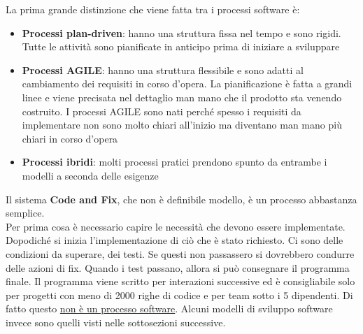 La prima grande distinzione che viene fatta tra i processi software è:
\begin{itemize}[noitemsep]
    \item \textbf{Processi plan-driven}: hanno una struttura fissa nel tempo e sono rigidi. Tutte le attività sono pianificate in anticipo prima di iniziare a sviluppare
    \item \textbf{Processi AGILE}: hanno una struttura flessibile e sono adatti al cambiamento dei requisiti in corso d'opera. La pianificazione è fatta a grandi linee e viene precisata nel dettaglio man mano che il prodotto sta venendo costruito. I processi AGILE sono nati perché spesso i requisiti da implementare non sono molto chiari all'inizio ma diventano man mano più chiari in corso d'opera
    \item \textbf{Processi ibridi}: molti processi pratici prendono spunto da entrambe i modelli a seconda delle esigenze
\end{itemize}
Il sistema \textbf{Code and Fix}, che non è definibile modello, è un processo abbastanza semplice.\\
Per prima cosa è necessario capire le necessità che devono essere implementate.
Dopodiché si inizia l'implementazione di ciò che è stato richiesto.
Ci sono delle condizioni da superare, dei testi.
Se questi non passassero si dovrebbero condurre delle azioni di fix.
Quando i test passano, allora si può consegnare il programma finale.
Il programma viene scritto per interazioni successive ed è consigliabile solo per progetti con meno di 2000 righe di codice e per team sotto i 5 dipendenti.
Di fatto questo \underline{non è un processo software}.
Alcuni modelli di sviluppo software invece sono quelli visti nelle sottosezioni successive.

